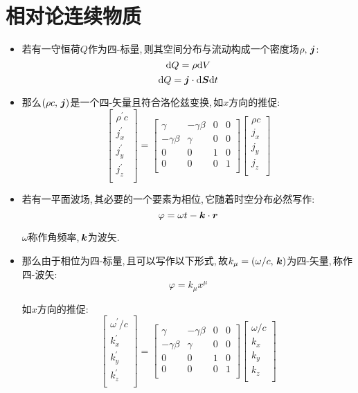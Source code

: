 \section{相对论连续物质}

\begin{itemize}
\item 若有一守恒荷$Q$作为四-标量,\,则其空间分布与流动构成一个密度场$\rho,\,\boldsymbol{j}$:
\[\textrm{d} Q=\rho\textrm{d} V\]
\[\textrm{d} Q=\boldsymbol{j}\cdot \textrm{d} \boldsymbol{S} \textrm{d} t\]

\item 那么$(\rho c,\,\boldsymbol{j})$是一个四-矢量且符合洛伦兹变换,\,如$x$方向的推促:
\[\left[ \begin{array}{c}
	\rho^{'}c\\
	j_x^{'}\\
	j_y^{'}\\
	j_z^{'}\\
\end{array} \right]  =\left[ \begin{matrix}
	\gamma&		-\gamma \beta&		0&		0\\
	-\gamma \beta&		\gamma&		0&		0\\
	0&		0&		1&		0\\
	0&		0&		0&		1\\
\end{matrix} \right] \left[ \begin{array}{c}
	\rho c\\
	j_x\\
	j_y\\
	j_z\\
\end{array} \right] \]

\item 若有一平面波场,\,其必要的一个要素为相位,\,它随着时空分布必然写作:
\[\varphi=\omega t-\boldsymbol{k}\cdot\boldsymbol{r}\]

$\omega$称作角频率,\,$\boldsymbol{k}$为波矢.

\item 那么由于相位为四-标量,\,且可以写作以下形式,\,故$k_\mu=(\omega/c,\,\boldsymbol{k})$为四-矢量,\,称作四-波矢:
\[\varphi=k_\mu x^\mu\]

如$x$方向的推促:
\[\left[ \begin{array}{c}
	\omega^{'}/c\\
	k_x^{'}\\
	k_y^{'}\\
	k_z^{'}\\
\end{array} \right]  =\left[ \begin{matrix}
	\gamma&		-\gamma \beta&		0&		0\\
	-\gamma \beta&		\gamma&		0&		0\\
	0&		0&		1&		0\\
	0&		0&		0&		1\\
\end{matrix} \right] \left[ \begin{array}{c}
	\omega /c\\
	k_x\\
	k_y\\
	k_z\\
\end{array} \right] \]


\end{itemize}
